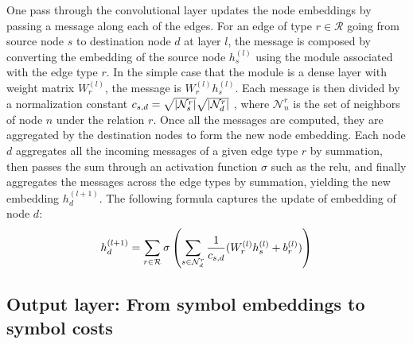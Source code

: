 One pass through the convolutional layer
updates the node embeddings by passing a message along each of the edges.
For an edge of type $r \in \mathcal{R}$ going from source node $s$ to destination node $d$ at layer $l$,
the message is composed by converting the embedding of the source node $h_s^{(l)}$
using the module associated with the edge type $r$.
In the simple case that the module is a dense layer with weight matrix $W_r^{(l)}$,
the message is $W_r^{(l)} h_s^{(l)}$.
Each message is then divided by a normalization constant
$c_{s,d} = \sqrt{\left|\mathcal{N}_s^r\right|} \sqrt{\left|\mathcal{N}_d^r\right|}$ \cite{kipf2017semisupervised},
where $\mathcal{N}_n^r$ is the set of neighbors of node $n$ under the relation $r$.
Once all the messages are computed,
they are aggregated by the destination nodes to form the new node embedding.
Each node $d$ aggregates all the incoming messages of a given edge type $r$ by summation,
then passes the sum through an activation function $\sigma$ such as the \gls{relu},
and finally aggregates the messages across the edge types by summation,
yielding the new embedding $h_d^{(l+1)}$.
The following formula captures the update of embedding of node $d$:
$$
h_d^{(l+1)} =
\sum_{r \in \mathcal{R}} \sigma \left(\sum_{s \in \mathcal{N}_d^r} \frac{1}{c_{s,d}} (W_r^{(l)} h_s^{(l)} + b_r^{(l)})\right)
$$


\subsection{Output layer: From symbol embeddings to symbol costs}
\label{sec:output}

